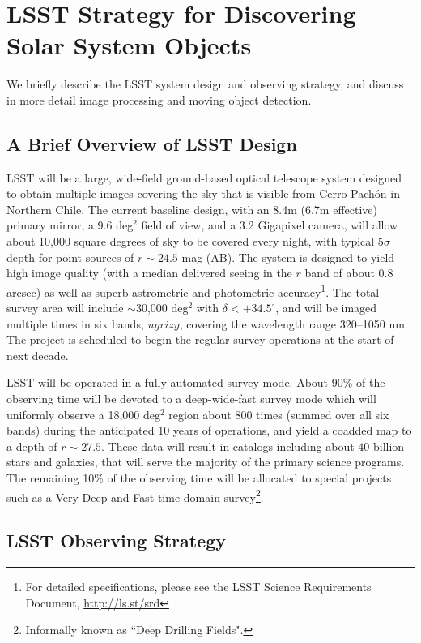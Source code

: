 \section{LSST Strategy for Discovering Solar System Objects}
\label{sec:strategy}

We briefly describe the LSST system design and observing strategy, and discuss in more
detail image processing and moving object detection.

\subsection{A Brief Overview of LSST  Design}

LSST will be a large, wide-field ground-based optical telescope system
designed to obtain multiple images covering the sky that is visible
from Cerro Pach\'{o}n in Northern Chile. The current baseline design,
with an 8.4m (6.7m effective) primary mirror, a 9.6 deg$^2$ field of
view, and a 3.2 Gigapixel camera, will allow about 10,000 square
degrees of sky to be covered every night, with typical 5$\sigma$ depth
for point sources of $r\sim24.5$ mag (AB). The system is designed to yield
high image quality (with a median delivered seeing in the $r$ band of
about 0.8 arcsec) as well as superb astrometric  and photometric
accuracy\footnote{For detailed specifications, please see the LSST
Science Requirements Document, \url{http://ls.st/srd}}. The total survey
area will include $\sim$30,000 deg$^2$ with $\delta<+34.5^\circ$, and
will be imaged multiple times in six bands, $ugrizy$, covering the
wavelength range 320--1050 nm. The project is scheduled to  begin the
regular survey operations at the start of next decade.

LSST will be operated in a fully automated survey mode. About 90\% of the
observing time will be devoted to a deep-wide-fast survey mode which will
uniformly observe a 18,000 deg$^2$ region about 800 times (summed over
all six bands) during the anticipated 10 years of operations, and yield a coadded map
to a depth of $r\sim27.5$. These data will result in catalogs including about
$40$ billion stars and galaxies, that will serve the majority of the
primary science programs. The remaining 10\% of the observing time
will be allocated to special projects such as a Very Deep and Fast
time domain survey\footnote{Informally known as ``Deep Drilling Fields".}.



\subsection{LSST Observing Strategy}

